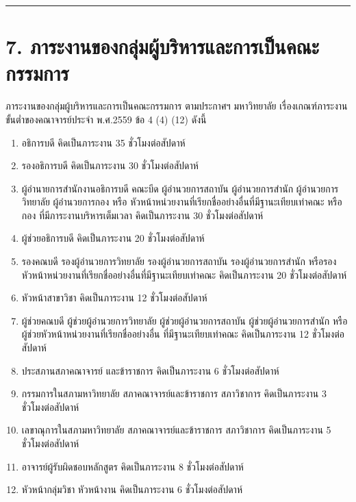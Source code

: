 \documentclass[a4paper,12pt,english]{sphinxmanual}
\begin{document}
\bigskip\hrule\bigskip



\section{7. ภาระงานของกลุ่มผู้บริหารและการเป็นคณะกรรมการ}
\label{\detokenize{workload_rubric:id104}}
ภาระงานของกลุ่มผู้บริหารและการเป็นคณะกรรมการ ตามประกาศฯ มหาวิทยาลัย เรื่องเกณฑ์ภาระงานขั้นต่ำของคณาจารย์ประจำ พ.ศ.2559 ข้อ 4 (4) \sphinxhyphen{} (12) ดังนี้
\begin{enumerate}
%
\item {} 
อธิการบดี คิดเป็นภาระงาน 35 ชั่วโมงต่อสัปดาห์

\item {} 
รองอธิการบดี คิดเป็นภาระงาน 30 ชั่วโมงต่อสัปดาห์

\item {} 
ผู้อำนายการสำนักงานอธิการบดี คณะบีด ผู้อำนวยการสถาบัน ผู้อำนวยการสำนัก ผู้อำนวยการวิทยาลัย ผู้อำนวยการกอง หรือ หัวหน้าหน่วยงานที่เรียกชื่ออย่างอื่นที่มีฐานะเทียบเท่าคณะ หรือกอง ที่มีภาระงานบริหารเต็มเวลา คิดเป็นภาระงาน 30 ชั่วโมงต่อสัปดาห์

\item {} 
ผู้ช่วยอธิการบดี คิดเป็นภาระงาน 20 ชั่วโมงต่อสัปดาห์

\item {} 
รองคณบดี รองผู้อำนวยการวิทยาลัย รองผู้อำนวยการสถาบัน รองผู้อำนวยการสำนัก หรือรองหัวหน้าหน่วยงานที่เรียกชื่ออย่างอื่นที่มีฐานะเทียบเท่าคณะ คิดเป็นภาระงาน 20 ชั่วโมงต่อสัปดาห์

\item {} 
หัวหน้าสาขาวิชา คิดเป็นภาระงาน 12 ชั่วโมงต่อสัปดาห์

\item {} 
ผู้ช่วยคณบดี ผู้ช่วยผู้อำนวยการวิทยาลัย ผู้ช่วยผู้อำนวยการสถาบัน ผู้ช่วยผู้อำนวยการสำนัก หรือผู้ช่วยหัวหน้าหน่วยงานที่เรียกชื่ออย่างอื่น ที่มีฐานะเทียบเท่าคณะ คิดเป็นภาระงาน 12 ชั่วโมงต่อสัปดาห์

\item {} 
ประสภานสภาคณาจารย์ และข้าราชการ คิดเป็นภาระงาน 6 ชั่วโมงต่อสัปดาห์

\item {} 
กรรมการในสภามหาวิทยาลัย สภาคณาจารย์และข้าราชการ สภาวิชาการ คิดเป็นภาระงาน 3 ชั่วโมงต่อสัปดาห์

\item {} 
เลขาณุการในสภามหาวิทยาลัย สภาคณาจารย์และข้าราชการ สภาวิชาการ คิดเป็นภาระงาน 5 ชั่วโมงต่อสัปดาห์

\item {} 
อาจารย์ผู้รับผิดชอบหลักสูตร คิดเป็นภาระงาน 8 ชั่วโมงต่อสัปดาห์

\item {} 
หัวหน้ากลุ่มวิชา หัวหน้างาน คิดเป็นภาระงาน 6 ชั่วโมงต่อสัปดาห์

\end{enumerate}
\end{document}

